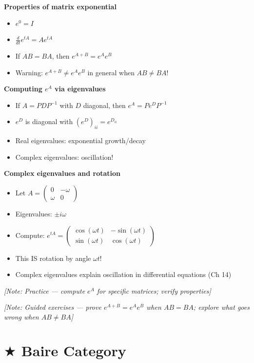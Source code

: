 \documentclass[
  10pt,
  letterpaper,
]{scrbook}
\providecommand{\tightlist}{%
  \setlength{\itemsep}{0pt}\setlength{\parskip}{0pt}}
\begin{document}
\textbf{Properties of matrix exponential}

\begin{itemize}
\tightlist
\item
  \(e^0 = I\)
\item
  \(\frac{d}{dt} e^{tA} = A e^{tA}\)
\item
  If \(AB = BA\), then \(e^{A+B} = e^A e^B\)
\item
  Warning: \(e^{A+B} \neq e^A e^B\) in general when \(AB \neq BA\)!
\end{itemize}

\textbf{Computing \(e^A\) via eigenvalues}

\begin{itemize}
\tightlist
\item
  If \(A = PDP^{-1}\) with \(D\) diagonal, then \(e^A = P e^D P^{-1}\)
\item
  \(e^D\) is diagonal with \((e^D)_{ii} = e^{D_{ii}}\)
\item
  Real eigenvalues: exponential growth/decay
\item
  Complex eigenvalues: oscillation!
\end{itemize}

\textbf{Complex eigenvalues and rotation}

\begin{itemize}
\tightlist
\item
  Let \(A = \begin{pmatrix} 0 & -\omega \\ \omega & 0 \end{pmatrix}\)
\item
  Eigenvalues: \(\pm i\omega\)
\item
  Compute:
  \(e^{tA} = \begin{pmatrix} \cos(\omega t) & -\sin(\omega t) \\ \sin(\omega t) & \cos(\omega t) \end{pmatrix}\)
\item
  This IS rotation by angle \(\omega t\)!
\item
  Complex eigenvalues explain oscillation in differential equations (Ch
  14)
\end{itemize}

\emph{{[}Note: Practice --- compute \(e^A\) for specific matrices;
verify properties{]}}

\emph{{[}Note: Guided exercises --- prove \(e^{A+B} = e^A e^B\) when
\(AB = BA\); explore what goes wrong when \(AB \neq BA\){]}}

\section{\texorpdfstring{\(\bigstar\) Baire
Category}{\textbackslash bigstar Baire Category}}\label{bigstar-baire-category}
\end{document}
